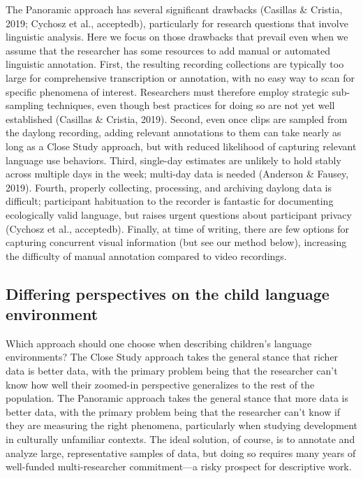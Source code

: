 \documentclass[,man,floatsintext]{apa6}
\begin{document}
The Panoramic approach has several significant drawbacks (Casillas \&
Cristia, 2019; Cychosz et al., acceptedb), particularly for research
questions that involve linguistic analysis. Here we focus on those
drawbacks that prevail even when we assume that the researcher has some
resources to add manual or automated linguistic annotation. First, the
resulting recording collections are typically too large for
comprehensive transcription or annotation, with no easy way to scan for
specific phenomena of interest. Researchers must therefore employ
strategic sub-sampling techniques, even though best practices for doing
so are not yet well established (Casillas \& Cristia, 2019). Second,
even once clips are sampled from the daylong recording, adding relevant
annotations to them can take nearly as long as a Close Study approach,
but with reduced likelihood of capturing relevant language use
behaviors. Third, single-day estimates are unlikely to hold stably
across multiple days in the week; multi-day data is needed (Anderson \&
Fausey, 2019). Fourth, properly collecting, processing, and archiving
daylong data is difficult; participant habituation to the recorder is
fantastic for documenting ecologically valid language, but raises urgent
questions about participant privacy (Cychosz et al., acceptedb).
Finally, at time of writing, there are few options for capturing
concurrent visual information (but see our method below), increasing the
difficulty of manual annotation compared to video recordings.

\subsection{Differing perspectives on the child language
environment}\label{differing-perspectives-on-the-child-language-environment}

Which approach should one choose when describing children's language
environments? The Close Study approach takes the general stance that
richer data is better data, with the primary problem being that the
researcher can't know how well their zoomed-in perspective generalizes
to the rest of the population. The Panoramic approach takes the general
stance that more data is better data, with the primary problem being
that the researcher can't know if they are measuring the right
phenomena, particularly when studying development in culturally
unfamiliar contexts. The ideal solution, of course, is to annotate and
analyze large, representative samples of data, but doing so requires
many years of well-funded multi-researcher commitment---a risky prospect
for descriptive work.
\end{document}
